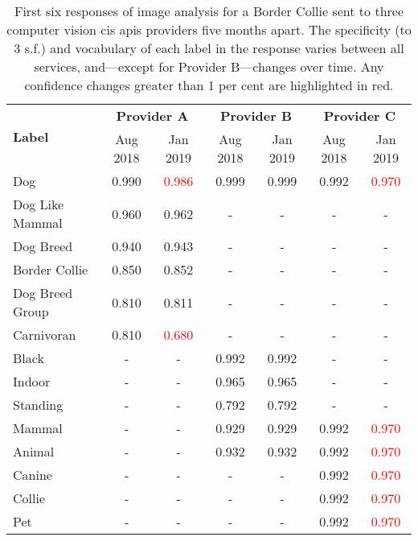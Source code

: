 \begin{table}[th!]
  \centering
  \caption[Varying confidence changes over time between 3 CV APIs]{First six responses of image analysis for a Border Collie sent to three computer vision \gls{cis} \glspl{api} providers five months apart. The specificity (to 3 s.f.) and vocabulary of each label in the response varies between all services, and---except for Provider B---changes over time. Any confidence changes greater than 1 per cent are highlighted in red.}
  \label{tab:introduction:motivation:scenario:pam:confchanges}
  \begin{tabular}{l|c|c|c|c|c|c}
    \toprule
    \multirow{2}{*}{\bfseries Label} &
    \multicolumn{2}{c}{\bfseries Provider A} &
    \multicolumn{2}{c}{\bfseries Provider B} &
    \multicolumn{2}{c}{\bfseries Provider C} \\
    &
    Aug 2018 & Jan 2019 &
    Aug 2018 & Jan 2019 &
    Aug 2018 & Jan 2019 \\
    \midrule
    Dog             & 0.990 & \textcolor{red}{0.986} & 0.999 & 0.999 & 0.992 & \textcolor{red}{0.970} \\
    Dog Like Mammal & 0.960 & 0.962 & -     & -     & -     & -     \\
    Dog Breed       & 0.940 & 0.943 & -     & -     & -     & -     \\
    Border Collie   & 0.850 & 0.852 & -     & -     & -     & -     \\
    Dog Breed Group & 0.810	& 0.811 & -     & -     & -     & -     \\
    Carnivoran      & 0.810 & \textcolor{red}{0.680} & -     & -     & -     & -     \\
    Black           & -     & -     & 0.992 & 0.992 & -     & -     \\
    Indoor          & -     & -     & 0.965 & 0.965 & -     & -     \\
    Standing        & -     & -     & 0.792 & 0.792 & -     & -     \\
    Mammal          & -     & -     & 0.929 & 0.929 & 0.992 & \textcolor{red}{0.970} \\
    Animal          & -     & -     & 0.932 & 0.932 & 0.992 & \textcolor{red}{0.970} \\
    Canine          & -     & -     & -     & -     & 0.992 & \textcolor{red}{0.970} \\
    Collie          & -     & -     & -     & -     & 0.992 & \textcolor{red}{0.970} \\
    Pet             & -     & -     & -     & -     & 0.992 & \textcolor{red}{0.970} \\
    \bottomrule
  \end{tabular}
\end{table}